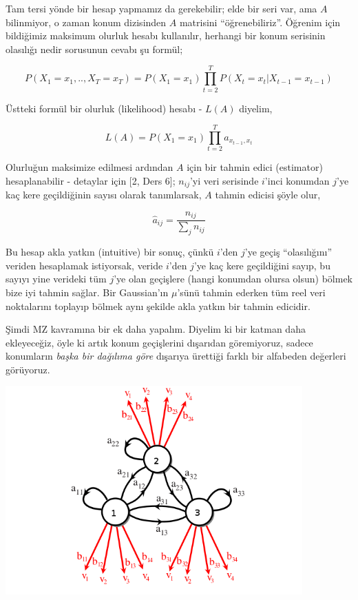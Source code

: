 \documentclass[12pt,fleqn]{article}\usepackage{../../common}
\begin{document}
Tam tersi yönde bir hesap yapmamız da gerekebilir; elde bir seri var, ama
$A$ bilinmiyor, o zaman konum dizisinden $A$ matrisini
``öğrenebiliriz''. Öğrenim için bildiğimiz maksimum olurluk hesabı
kullanılır, herhangi bir konum serisinin olasılığı nedir sorusunun cevabı
şu formül;

$$ P(X_1=x_1,..,X_T=x_T) = 
P(X_1=x_1) \prod _{t=2}^{T} P(X_t=x_t | X_{t-1}=x_{t-1})
$$

Üstteki formül bir olurluk (likelihood) hesabı - $L(A)$ diyelim, 

$$ L(A) = P(X_1=x_1) \prod _{ t=2}^{T} a_{x_{t-1},x_t} $$

Olurluğun maksimize edilmesi ardından $A$ için bir tahmin edici
(estimator) hesaplanabilir - detaylar için [2, Ders 6]; $n_{ij}$'yi veri
serisinde $i$'inci konumdan $j$'ye kaç kere geçildiğinin sayısı olarak
tanımlarsak, $A$ tahmin edicisi şöyle olur,

$$ \hat{a}_{ij} = \frac{n_{ij}}{\sum_j n_{ij}}  $$

Bu hesap akla yatkın (intuitive) bir sonuç, çünkü $i$'den $j$'ye geçiş
``olasılığını'' veriden hesaplamak istiyorsak, veride $i$'den $j$'ye kaç
kere geçildiğini sayıp, bu sayıyı yine verideki tüm $j$'ye olan geçişlere
(hangi konumdan olursa olsun) bölmek bize iyi tahmin sağlar. Bir
Gaussian'ın $\mu$'sünü tahmin ederken tüm reel veri noktalarını toplayıp
bölmek aynı şekilde akla yatkın bir tahmin edicidir.

Şimdi MZ kavramına bir ek daha yapalım. Diyelim ki bir katman daha
ekleyeceğiz, öyle ki artık konum geçişlerini dışarıdan göremiyoruz, sadece
konumların {\em başka bir dağılıma göre} dışarıya ürettiği farklı bir
alfabeden değerleri görüyoruz.

\includegraphics[height=8cm]{tser_hmm_02.png}
\end{document}
